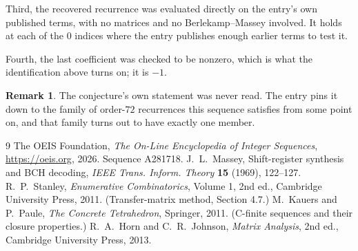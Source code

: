 \documentclass[11pt,a4paper]{article}
\theoremstyle{plain}
\theoremstyle{definition}
\newtheorem{remark}[theorem]{Remark}
\begin{document}
Third, the recovered recurrence was evaluated directly on the entry's own published terms, with
no matrices and no Berlekamp--Massey involved. It holds at each of the $0$ indices where
the entry publishes enough earlier terms to test it.

Fourth, the last coefficient was checked to be nonzero, which is what the identification above
turns on; it is $-1$.

\begin{remark}
The conjecture's own statement was never read. The entry pins it down to the family of
order-$72$ recurrences this sequence satisfies from some point on, and that family turns
out to have exactly one member.
\end{remark}

\begin{thebibliography}{9}
 The OEIS Foundation, \emph{The On-Line Encyclopedia of Integer
Sequences}, \url{https://oeis.org}, 2026. Sequence A281718.
 J.~L.~Massey, Shift-register synthesis and BCH decoding, \emph{IEEE
Trans. Inform. Theory} \textbf{15} (1969), 122--127.
 R.~P.~Stanley, \emph{Enumerative Combinatorics}, Volume 1, 2nd ed.,
Cambridge University Press, 2011. (Transfer-matrix method, Section 4.7.)
 M.~Kauers and P.~Paule, \emph{The Concrete Tetrahedron}, Springer, 2011.
(C-finite sequences and their closure properties.)
 R.~A.~Horn and C.~R.~Johnson, \emph{Matrix Analysis}, 2nd ed., Cambridge
University Press, 2013.
\end{thebibliography}
\end{document}
